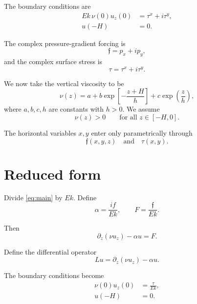 \documentclass[10pt]{amsart}
\begin{document}
The boundary conditions are
\begin{align}
E k\,\nu(0)u_z(0) &= \tau^x+i\tau^y, \label{eq:surface_bc}\\
u(-H)&=0. \label{eq:bottom_bc}
\end{align}

The complex pressure-gradient forcing is
\begin{equation}
\mathfrak f
=
p_x+i p_y,
\label{eq:pressure_gradient}
\end{equation}
and the complex surface stress is
\begin{equation}
\tau
=
\tau^x+i\tau^y.
\label{eq:stress}
\end{equation}

We now take the vertical viscosity to be
\begin{equation}
\nu(z)
=
a+b\exp\!\left[-\frac{z+H}{h}\right]
+
c\exp\!\left(\frac{z}{h}\right),
\label{eq:viscosity_z}
\end{equation}
where \(a,b,c,h\) are constants with \(h>0\). We assume
\begin{equation}
\nu(z)>0
\qquad
\text{for all } z\in[-H,0].
\end{equation}

The horizontal variables \(x,y\) enter only parametrically through
\[
\mathfrak f(x,y,z)
\quad\text{and}\quad
\tau(x,y).
\]

\section{Reduced form}

Divide \eqref{eq:main} by \(E k\). Define
\begin{equation}
\alpha
=
\frac{i f}{E k},
\qquad
F
=
\frac{\mathfrak f}{E k}.
\label{eq:alpha_F}
\end{equation}

Then
\begin{equation}
\partial_z(\nu u_z)-\alpha u=F.
\label{eq:reduced}
\end{equation}

Define the differential operator
\begin{equation}
L u
=
\partial_z(\nu u_z)-\alpha u.
\label{eq:L_def}
\end{equation}

The boundary conditions become
\begin{align}
\nu(0)u_z(0)&=\frac{\tau}{E k}, \label{eq:reduced_surface_bc}\\
u(-H)&=0. \label{eq:reduced_bottom_bc}
\end{align}
\end{document}
